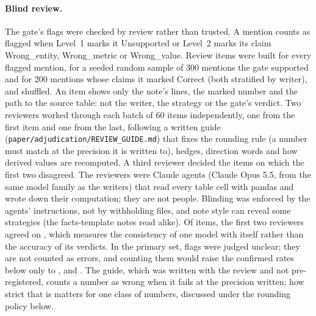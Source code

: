 \documentclass[11pt]{article}
\begin{document}
\paragraph{Blind review.} The gate's flags were checked by review rather than trusted. A mention counts as flagged when Level~1 marks it Unsupported or Level~2 marks its claim Wrong\_entity, Wrong\_metric or Wrong\_value. Review items were built for every flagged mention, for a seeded random sample of 300 mentions the gate supported and for 200 mentions whose claims it marked Correct (both stratified by writer), and shuffled. An item shows only the note's lines, the marked number and the path to the source table: not the writer, the strategy or the gate's verdict. Two reviewers worked through each batch of 60 items independently, one from the first item and one from the last, following a written guide (\texttt{paper/adjudication/REVIEW\_GUIDE.md}) that fixes the rounding rule (a number must match at the precision it is written to), hedges, direction words and how derived values are recomputed. A third reviewer decided the items on which the first two disagreed. The reviewers were Claude agents (Claude Opus 5.5, from the same model family as the writers) that read every table cell with pandas and wrote down their computation; they are not people. Blinding was enforced by the agents' instructions, not by withholding files, and note style can reveal some strategies (the facts-template notes read alike). Of \ReviewItems{} items, the first two reviewers agreed on \ReviewAgree{}, which measures the consistency of one model with itself rather than the accuracy of its verdicts. In the primary set, \UnclearPooled{} flags were judged unclear; they are not counted as errors, and counting them would raise the confirmed rates below only to \WithUnclearOpus{}, \WithUnclearSonnet{} and \WithUnclearHaiku{}. The guide, which was written with the review and not pre-registered, counts a number as wrong when it fails at the precision written; how strict that is matters for one class of numbers, discussed under the rounding policy below.
\end{document}
